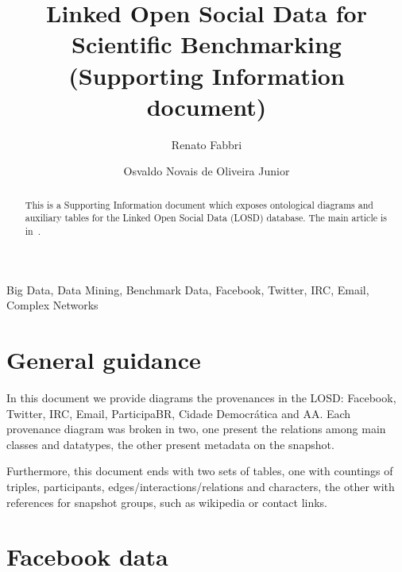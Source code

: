 \documentclass[review]{elsarticle}
\begin{document}
%
\begin{frontmatter}
%
\title{Linked Open Social Data for Scientific Benchmarking (Supporting
Information document)}
%
\author[pwr]{Renato Fabbri}
%
\author[pwr]{Osvaldo Novais de Oliveira Junior}
%
\address[pwr]{S\~ao Carlos Institute of Physics, S\~ao Paulo
University, Brazil}
%
%
\begin{abstract}
This is a Supporting Information document which exposes ontological
diagrams and auxiliary tables for the Linked Open Social Data (LOSD)
database. The main article is in~\cite{losd}.
\end{abstract}
%
\begin{keyword}
Big Data, Data Mining, Benchmark Data, Facebook, Twitter, IRC, Email, Complex Networks
\end{keyword}

\end{frontmatter}
\pdfpageheight 8in
\tableofcontents
\section{General guidance}
In this document we provide diagrams
the provenances in the LOSD:
Facebook, Twitter, IRC, Email, ParticipaBR, Cidade Democrática and AA.
Each provenance diagram was broken in two, one present the relations
among main classes and datatypes, the other present metadata on the
snapshot.

Furthermore, this document ends with two sets of tables, one with countings of
triples, participants, edges/interactions/relations and characters,
the other with references for snapshot groups, such as wikipedia or
contact links.



\section{Facebook data}

% 
\end{document}
